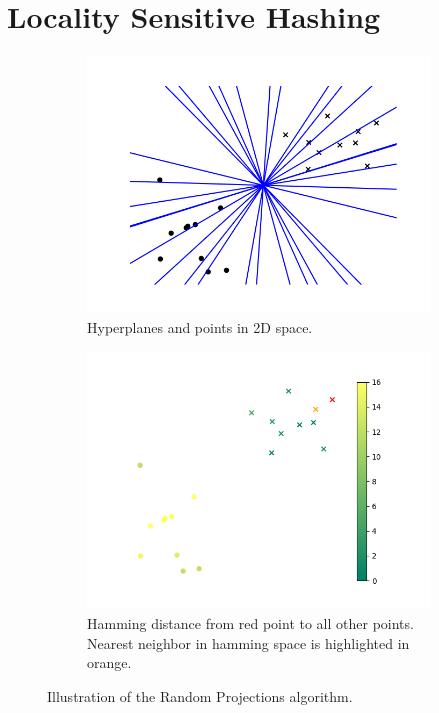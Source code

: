 \section{Locality Sensitive Hashing}\label{sec:hashing}

\begin{figure}[t]
    \centering
    \begin{subfigure}[t]{0.24\textwidth}
        \includegraphics[width=\textwidth]{images/lsh_planes.png}
        \caption{Hyperplanes and points in 2D space.}   
        \label{fig:lshplanes}   
    \end{subfigure} 
    \begin{subfigure}[t]{0.24\textwidth}
        \includegraphics[width=\textwidth]{images/lsh_distance.png}
        \caption{Hamming distance from red point to all other points. Nearest neighbor in hamming space is highlighted in orange.}
        \label{fig:lshdist}
    \end{subfigure}
    \caption{Illustration of the Random Projections algorithm.}
    \label{fig:lsh}
\end{figure}

